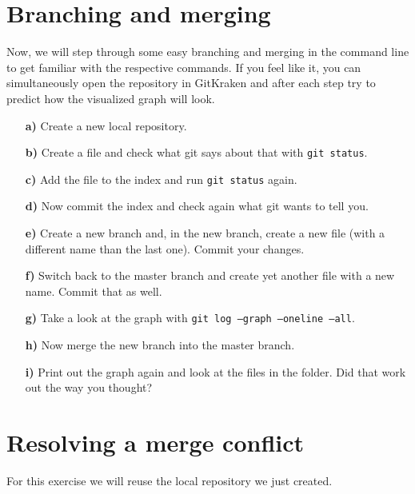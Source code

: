 \documentclass[11pt]{article}
\begin{document}
\section*{Branching and merging}
Now, we will step through some easy branching and merging in the command line to get familiar with the respective commands. If you feel like it, you can simultaneously open the repository in GitKraken and after each step try to predict how the visualized graph will look.

\begin{itemize}
\item[\bf{a)}] Create a new local repository.
\item[\bf{b)}] Create a file and check what git says about that with \texttt{git status}.
\item[\bf{c)}] Add the file to the index and run \texttt{git status} again.
\item[\bf{d)}] Now commit the index and check again what git wants to tell you.
\item[\bf{e)}] Create a new branch and, in the new branch, create a new file (with a different name than the last one). Commit your changes.
\item[\bf{f)}] Switch back to the master branch and create yet another file with a new name. Commit that as well.
\item[\bf{g)}] Take a look at the graph with \texttt{git log --graph --oneline --all}.
\item[\bf{h)}] Now merge the new branch into the master branch.
\item[\bf{i)}] Print out the graph again and look at the files in the folder. Did that work out the way you thought?
\end{itemize}

\section*{Resolving a merge conflict}
For this exercise we will reuse the local repository we just created.
\end{document}
